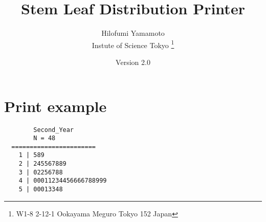 \documentclass[uplatex,a4paper]{jsarticle}
\begin{document}
\title{Stem Leaf Distribution Printer}
\author{Hilofumi Yamamoto \\ Instute of Science Tokyo
\thanks{W1-8 2-12-1 Ookayama Meguro Tokyo 152 Japan}}
\date{Version 2.0}
\maketitle

\section{Print example}

\begin{verbatim}
        Second_Year
        N = 48
  =======================
    1 | 589
    2 | 245567889
    3 | 02256788
    4 | 00011234456666788999
    5 | 00013348
\end{verbatim}
\end{document}
